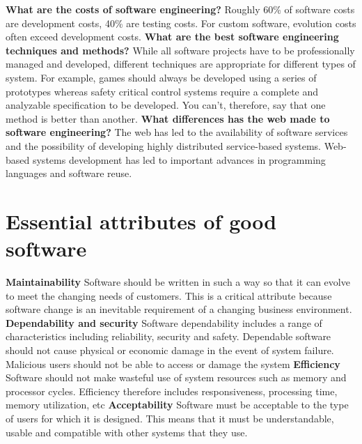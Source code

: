\documentclass{article}
\begin{document}
\textbf{What are the costs of software engineering?}\newline
Roughly 60\% of software costs are development costs, 40\% are testing costs. For custom software, evolution costs often exceed development costs.
\newline\newline
\textbf{What are the best software engineering techniques and methods?}\newline
While all software projects have to be professionally managed and developed, different techniques are appropriate for different types of system. For example, games should always be developed using a series of prototypes whereas safety critical control systems require a complete and analyzable specification to be developed. You can’t, therefore, say that one method is better than another.
\newline\newline
\textbf{What differences has the web made to software engineering?}\newline
The web has led to the availability of software services and the possibility of developing highly distributed service-based systems. Web-based systems development has led to important advances in programming languages and software reuse.

\newpage
\section{Essential attributes of good software}
\vspace{-8pt}
\textbf{Maintainability}\newline
Software should be written in such a way so that it can evolve to meet the changing needs of customers. This is a critical attribute because software change is an inevitable requirement of a changing business environment.
\newline\newline
\textbf{Dependability and security}\newline
Software dependability includes a range of characteristics including reliability, security and safety. Dependable software should not cause physical or economic damage in the event of
system failure. Malicious users should not be able to access or damage the system
\newline\newline
\textbf{Efficiency}\newline
Software should not make wasteful use of system resources such as memory and processor cycles. Efficiency therefore includes responsiveness, processing time, memory utilization, etc
\newline\newline
\textbf{Acceptability}\newline
Software must be acceptable to the type of users for which it is designed. This means that it must be understandable, usable and compatible with other systems that they use.
\end{document}
